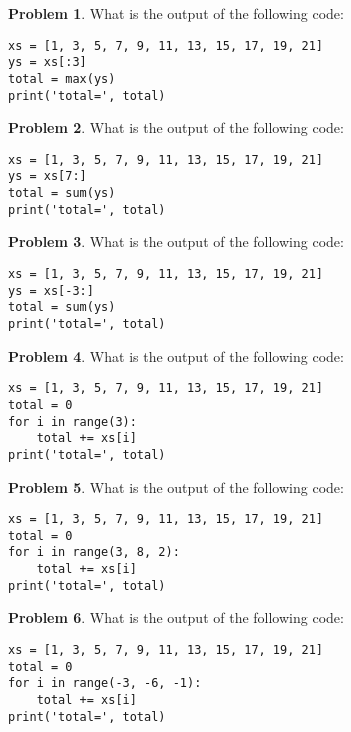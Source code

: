 \documentclass[10pt]{article}
\theoremstyle{definition}
\newtheorem{problem}{Problem}
\begin{document}
\begin{problem}
    What is the output of the following code:
\end{problem}
\begin{lstlisting}
xs = [1, 3, 5, 7, 9, 11, 13, 15, 17, 19, 21]
ys = xs[:3]
total = max(ys)
print('total=', total)
\end{lstlisting}
\vspace{2in}

\begin{problem}
    What is the output of the following code:
\end{problem}
\begin{lstlisting}
xs = [1, 3, 5, 7, 9, 11, 13, 15, 17, 19, 21]
ys = xs[7:]
total = sum(ys)
print('total=', total)
\end{lstlisting}
\vspace{2in}

\begin{problem}
    What is the output of the following code:
\end{problem}
\begin{lstlisting}
xs = [1, 3, 5, 7, 9, 11, 13, 15, 17, 19, 21]
ys = xs[-3:]
total = sum(ys)
print('total=', total)
\end{lstlisting}
\vspace{2in}

\begin{problem}
    What is the output of the following code:
\end{problem}
\begin{lstlisting}
xs = [1, 3, 5, 7, 9, 11, 13, 15, 17, 19, 21]
total = 0
for i in range(3):
    total += xs[i]
print('total=', total)
\end{lstlisting}
\vspace{2in}

\begin{problem}
    What is the output of the following code:
\end{problem}
\begin{lstlisting}
xs = [1, 3, 5, 7, 9, 11, 13, 15, 17, 19, 21]
total = 0
for i in range(3, 8, 2):
    total += xs[i]
print('total=', total)
\end{lstlisting}
\vspace{2in}

\begin{problem}
    What is the output of the following code:
\end{problem}
\begin{lstlisting}
xs = [1, 3, 5, 7, 9, 11, 13, 15, 17, 19, 21]
total = 0
for i in range(-3, -6, -1):
    total += xs[i]
print('total=', total)
\end{lstlisting}
\vspace{2in}
\end{document}
